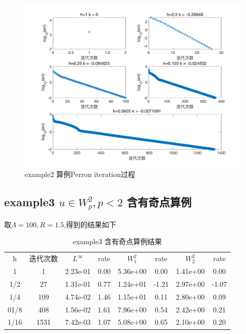 \documentclass[11pt]{article}
\begin{document}
\begin{figure}[htp!]
\centering
\caption{example2 算例Perron iteration过程}
\includegraphics[width=1.0\textwidth]{2.png}
\end{figure}







\subsection{example3 $u\in W^2_p, p<2$ 含有奇点算例}

取$\Lambda=100,R=1.5$,得到的结果如下

\begin{table}[!htbp]
\centering
\caption{example3 含有奇点算例结果}
\label{table}
    \begin{tabular}{  c| c|c c|c c| c c }
          \hline      
  \hline
  
\hline



    \hline     
  
  
\hline



    \hline     
    \hline   
    
 h  &迭代次数  	&$L^\infty{}$& rate&$W_1^2$&rate&$W_2^2$&rate\\

1&1&2.23e-01	&0.00	&5.36e+00	&0.00	&1.41e+00	&0.00\\
1/2&27&1.31e-01	&0.77	&1.24e+01	&-1.21	&2.97e+00	&-1.07\\
1/4&109&4.74e-02	&1.46	&1.15e+01	&0.11	&2.80e+00	&0.09\\
01/8&408&1.56e-02	&1.61	&7.96e+00	&0.54	&2.42e+00	&0.21\\
1/16&1531&7.42e-03	&1.07	&5.08e+00	&0.65	&2.10e+00	&0.20\\ 


      \hline      
  \hline
  
\hline



    \hline     
    \hline
 
  \hline
  
\hline


    \end{tabular}
\end{table}
\end{document}
